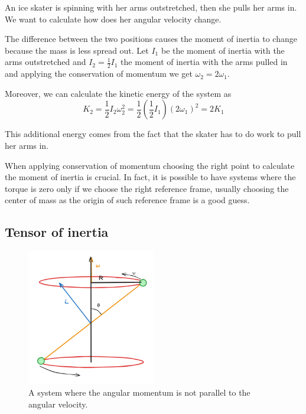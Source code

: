 \documentclass[14pt]{extarticle}
\begin{document}
\begin{example}
    An ice skater is spinning with her arms outstretched, then she pulls her arms in.
    We want to calculate how does her angular velocity change.

    The difference between the two positions causes the moment of inertia to change because the mass is less spread out.
    Let $I_1$ be the moment of inertia with the arms outstretched and $I_2 = \frac{1}{2} I_1$ the moment of inertia with the arms pulled in and applying the conservation of momentum we get $\omega_2 = 2 \omega_1$.

    Moreover, we can calculate the kinetic energy of the system as
    \begin{equation}
        K_2 = \frac{1}{2} I_2 \omega_2^2 = \frac{1}{2} \left(\frac{1}{2} I_1\right) (2 \omega_1)^2 = 2 K_1
    \end{equation}

    This additional energy comes from the fact that the skater has to do work to pull her arms in.
\end{example}

When applying conservation of momentum choosing the right point to calculate the moment of inertia is crucial.
In fact, it is possible to have systems where the torque is zero only if we choose the right reference frame, usually choosing the center of mass as the origin of such reference frame is a good guess.


\subsection{Tensor of inertia}

\begin{figure}[H]
    \centering
    \includegraphics[width=0.5\textwidth]{assets/S2_P2_PHY1/skew.png}
    \caption{A system where the angular momentum is not parallel to the angular velocity.}
    \label{fig:tensor-of-inertia}
\end{figure}
\end{document}
